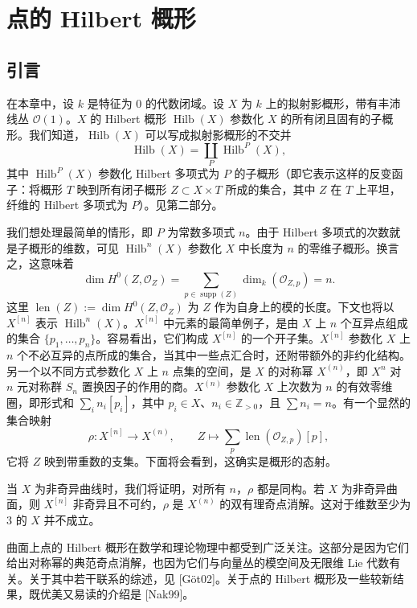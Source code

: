 \chapter{点的 Hilbert 概形}
\section*{引言}
在本章中，设 $k$ 是特征为 $0$ 的代数闭域。设 $X$ 为 $k$ 上的拟射影概形，带有丰沛线丛 $\mathcal O(1)$。$X$ 的 Hilbert 概形 $\operatorname{Hilb}(X)$ 参数化 $X$ 的所有闭且固有的子概形。我们知道，$\operatorname{Hilb}(X)$ 可以写成拟射影概形的不交并
\[
\operatorname{Hilb}(X)=\coprod_P\operatorname{Hilb}^P(X),
\]
其中 $\operatorname{Hilb}^P(X)$ 参数化 Hilbert 多项式为 $P$ 的子概形（即它表示这样的反变函子：将概形 $T$ 映到所有闭子概形 $Z\subset X\times T$ 所成的集合，其中 $Z$ 在 $T$ 上平坦，纤维的 Hilbert 多项式为 $P$）。见第二部分。

我们想处理最简单的情形，即 $P$ 为常数多项式 $n$。由于 Hilbert 多项式的次数就是子概形的维数，可见 $\operatorname{Hilb}^n(X)$ 参数化 $X$ 中长度为 $n$ 的零维子概形。换言之，这意味着
\[
\dim H^0(Z,\mathcal O_Z)
=\sum_{p\in\operatorname{supp}(Z)}\dim_k(\mathcal O_{Z,p})=n.
\]
这里 $\operatorname{len}(Z):=\dim H^0(Z,\mathcal O_Z)$ 为 $Z$ 作为自身上的模的长度。下文也将以 $X^{[n]}$ 表示 $\operatorname{Hilb}^n(X)$。$X^{[n]}$ 中元素的最简单例子，是由 $X$ 上 $n$ 个互异点组成的集合 $\{p_1,\ldots,p_n\}$。容易看出，它们构成 $X^{[n]}$ 的一个开子集。$X^{[n]}$ 参数化 $X$ 上 $n$ 个不必互异的点所成的集合，当其中一些点汇合时，还附带额外的非约化结构。另一个以不同方式参数化 $X$ 上 $n$ 点集的空间，是 $X$ 的对称幂 $X^{(n)}$，即 $X^n$ 对 $n$ 元对称群 $S_n$ 置换因子的作用的商。$X^{(n)}$ 参数化 $X$ 上次数为 $n$ 的有效零维圈，即形式和 $\sum_i n_i[p_i]$，其中 $p_i\in X$、$n_i\in\mathbb Z_{>0}$，且 $\sum n_i=n$。有一个显然的集合映射
\[
\rho:X^{[n]}\longrightarrow X^{(n)},\qquad
Z\longmapsto\sum_p\operatorname{len}(\mathcal O_{Z,p})[p],
\]
它将 $Z$ 映到带重数的支集。下面将会看到，这确实是概形的态射。

当 $X$ 为非奇异曲线时，我们将证明，对所有 $n$，$\rho$ 都是同构。若 $X$ 为非奇异曲面，则 $X^{[n]}$ 非奇异且不可约，$\rho$ 是 $X^{(n)}$ 的双有理奇点消解。这对于维数至少为 $3$ 的 $X$ 并不成立。

曲面上点的 Hilbert 概形在数学和理论物理中都受到广泛关注。这部分是因为它们给出对称幂的典范奇点消解，也因为它们与向量丛的模空间及无限维 Lie 代数有关。关于其中若干联系的综述，见 [Göt02]。关于点的 Hilbert 概形及一些较新结果，既优美又易读的介绍是 [Nak99]。

